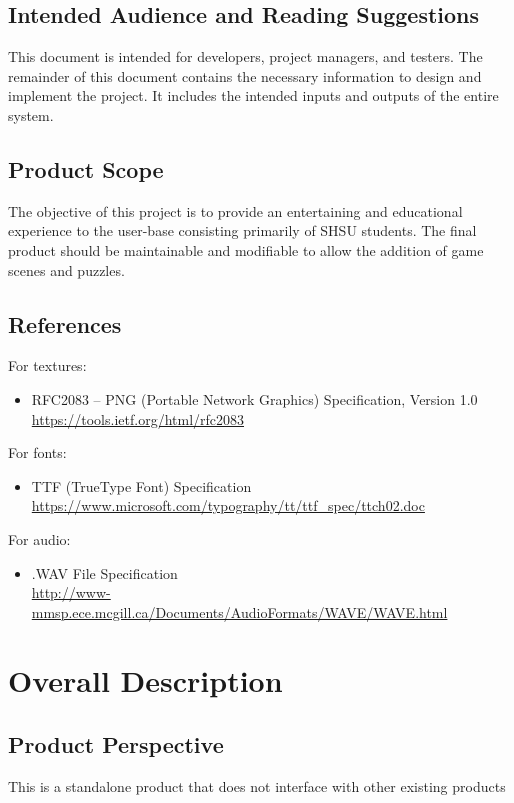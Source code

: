 \documentclass{article}
\begin{document}
	\subsection{Intended Audience and Reading Suggestions}
		This document is intended for developers, project managers, and testers. The remainder of this document contains the necessary information to design and implement the project. It includes the intended inputs and outputs of the entire system.
	
	\subsection{Product Scope}
		The objective of this project is to provide an entertaining and educational experience to the user-base consisting primarily of SHSU students. The final product should be maintainable and modifiable to allow the addition of game scenes and puzzles.
	
	\subsection{References}
		For textures:
		\begin{itemize}
			\item RFC2083 -- PNG (Portable Network Graphics) Specification, Version 1.0\\ \url{https://tools.ietf.org/html/rfc2083}
		\end{itemize}
    For fonts:
    \begin{itemize}
      \item TTF (TrueType Font) Specification\\ \url{https://www.microsoft.com/typography/tt/ttf_spec/ttch02.doc}
    \end{itemize}
		For audio:
		\begin{itemize}
			\item .WAV File Specification\\ \url{http://www-mmsp.ece.mcgill.ca/Documents/AudioFormats/WAVE/WAVE.html}
		\end{itemize}
\section{Overall Description}
	\subsection{Product Perspective}
		This is a standalone product that does not interface with other existing products
	
\end{document}
